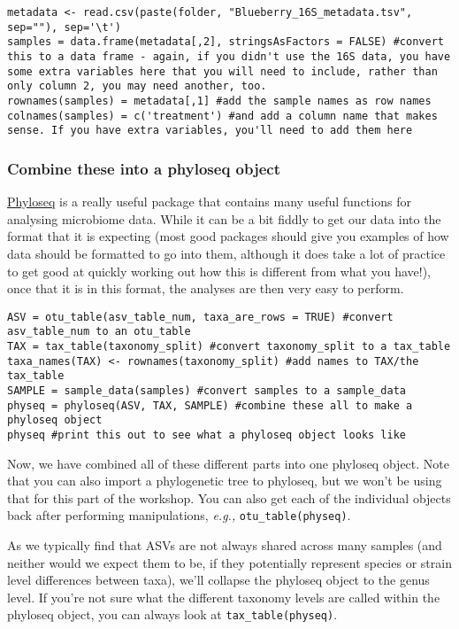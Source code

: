 \documentclass[
]{book}
\begin{document}
\begin{verbatim}
metadata <- read.csv(paste(folder, "Blueberry_16S_metadata.tsv", sep=""), sep='\t')
samples = data.frame(metadata[,2], stringsAsFactors = FALSE) #convert this to a data frame - again, if you didn't use the 16S data, you have some extra variables here that you will need to include, rather than only column 2, you may need another, too. 
rownames(samples) = metadata[,1] #add the sample names as row names
colnames(samples) = c('treatment') #and add a column name that makes sense. If you have extra variables, you'll need to add them here
\end{verbatim}

\subsubsection{Combine these into a phyloseq object}\label{combine-these-into-a-phyloseq-object-1}

\href{https://joey711.github.io/phyloseq/}{Phyloseq} is a really useful package that contains many useful functions for analysing microbiome data. While it can be a bit fiddly to get our data into the format that it is expecting (most good packages should give you examples of how data should be formatted to go into them, although it does take a lot of practice to get good at quickly working out how this is different from what you have!), once that it is in this format, the analyses are then very easy to perform.

\begin{verbatim}
ASV = otu_table(asv_table_num, taxa_are_rows = TRUE) #convert asv_table_num to an otu_table
TAX = tax_table(taxonomy_split) #convert taxonomy_split to a tax_table
taxa_names(TAX) <- rownames(taxonomy_split) #add names to TAX/the tax_table
SAMPLE = sample_data(samples) #convert samples to a sample_data
physeq = phyloseq(ASV, TAX, SAMPLE) #combine these all to make a phyloseq object
physeq #print this out to see what a phyloseq object looks like
\end{verbatim}

Now, we have combined all of these different parts into one phyloseq object. Note that you can also import a phylogenetic tree to phyloseq, but we won't be using that for this part of the workshop. You can also get each of the individual objects back after performing manipulations, \emph{e.g.,} \texttt{otu\_table(physeq)}.

As we typically find that ASVs are not always shared across many samples (and neither would we expect them to be, if they potentially represent species or strain level differences between taxa), we'll collapse the phyloseq object to the genus level. If you're not sure what the different taxonomy levels are called within the phyloseq object, you can always look at \texttt{tax\_table(physeq)}.
\end{document}
